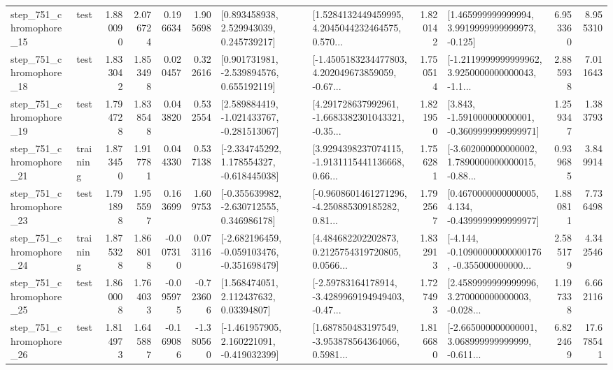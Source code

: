 \begin{tabular}{llrrrrllrlrr}
  step\_751\_chromophore\_15 &      test &      1.880090 &    2.076724 &      0.196634 &  1.905698 &     [0.893458938, 2.529943039, 0.245739217] &  [1.5284132449459995, 4.2045044232464575, 0.570... &       1.820142 &    [1.465999999999994, 3.9919999999999973, -0.125] &            6.953360 &          8.955310 \\
  step\_751\_chromophore\_18 &      test &      1.833042 &    1.853498 &      0.020457 &  0.322616 &    [0.901731981, -2.539894576, 0.655192119] &  [-1.4505183234477803, 4.202049673859059, -0.67... &       1.750514 &  [-1.2119999999999962, 3.9250000000000043, -1.1... &            2.885938 &          7.011643 \\
  step\_751\_chromophore\_19 &      test &      1.794728 &    1.838548 &      0.043820 &  0.532554 &   [2.589884419, -1.021433767, -0.281513067] &  [4.291728637992961, -1.6683382301043321, -0.35... &       1.821950 &   [3.843, -1.591000000000001, -0.3609999999999971] &            1.259347 &          1.383793 \\
  step\_751\_chromophore\_21 &  training &      1.873450 &    1.917781 &      0.044330 &  0.537138 &   [-2.334745292, 1.178554327, -0.618445038] &  [3.9294398237074115, -1.9131115441136668, 0.66... &       1.756281 &  [-3.602000000000002, 1.7890000000000015, -0.88... &            0.939685 &          3.849914 \\
  step\_751\_chromophore\_23 &      test &      1.791898 &    1.955597 &      0.163699 &  1.609753 &   [-0.355639982, -2.630712555, 0.346986178] &  [-0.9608601461271296, -4.250885309185282, 0.81... &       1.792567 &   [0.4670000000000005, 4.134, -0.4399999999999977] &            1.880811 &          7.736498 \\
  step\_751\_chromophore\_24 &  training &      1.875328 &    1.868018 &     -0.007310 &  0.073116 &  [-2.682196459, -0.059103476, -0.351698479] &  [4.484682202202873, 0.2125754319720805, 0.0566... &       1.832913 &  [-4.144, -0.10900000000000176, -0.355000000000... &            2.585179 &          4.342546 \\
  step\_751\_chromophore\_25 &      test &      1.860008 &    1.764033 &     -0.095975 & -0.723606 &      [1.568474051, 2.112437632, 0.03394807] &  [-2.59783164178914, -3.4289969194949403, -0.47... &       1.727493 &  [2.4589999999999996, 3.270000000000003, -0.028... &            1.197338 &          6.662116 \\
  step\_751\_chromophore\_26 &      test &      1.814973 &    1.645887 &     -0.169086 & -1.380560 &   [-1.461957905, 2.160221091, -0.419032399] &  [1.687850483197549, -3.953878564364066, 0.5981... &       1.816680 &  [-2.665000000000001, 3.068999999999999, -0.611... &            6.822469 &         17.678541 \\

\end{tabular}
